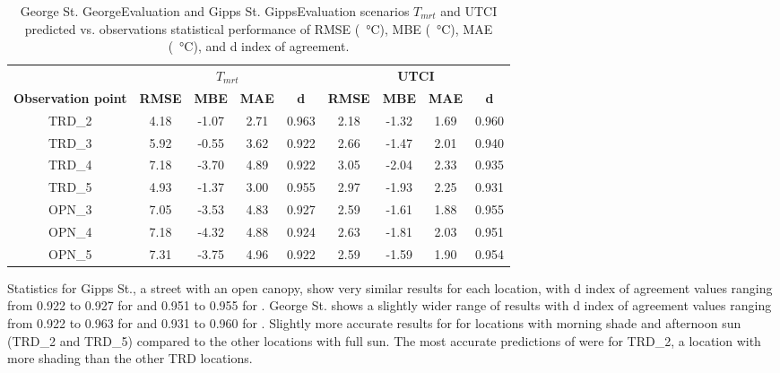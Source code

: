 \documentclass[final,3p,times,authoryear]{elsarticle}
\begin{document}
\begin{center}
\begin{table}
\caption{George St. GeorgeEvaluation and Gipps St. GippsEvaluation scenarios $T_{mrt}$ and UTCI predicted vs. observations statistical performance of RMSE (\SI{}{\degreeCelsius}), MBE (\SI{}{\degreeCelsius}), MAE (\SI{}{\degreeCelsius}), and d index of agreement.\label{tab:georgetmrt}}
  \begin{tabular}{ |c|c | c |c |c  | c | c |  c|c|}   
  \hline    &  \multicolumn{4}{c|}{\textbf{$T_{mrt}$}} & \multicolumn{4}{c|}{\textbf{UTCI}}  \\  
  \textbf{Observation point} 
	& \textbf{RMSE} 
	& \textbf{MBE} 
	& \textbf{MAE} 
	& \textbf{d} 
	& \textbf{RMSE} 
	& \textbf{MBE} 
	& \textbf{MAE}
	& \textbf{d}	
	\\ \hline
TRD\_2 & 4.18 & -1.07 & 2.71 & 0.963 & 2.18 & -1.32 & 1.69 & 0.960  \\ \hline
TRD\_3 & 5.92 & -0.55 & 3.62 & 0.922 & 2.66 & -1.47 & 2.01 & 0.940  \\ \hline
TRD\_4 & 7.18 & -3.70 & 4.89 & 0.922 & 3.05 & -2.04 & 2.33 & 0.935  \\ \hline
TRD\_5 & 4.93 & -1.37 & 3.00 & 0.955 & 2.97 & -1.93 & 2.25 & 0.931  \\ \hline
OPN\_3 & 7.05 & -3.53 & 4.83 & 0.927 & 2.59 & -1.61 & 1.88 & 0.955   \\ \hline
OPN\_4 & 7.18 & -4.32 & 4.88 & 0.924 & 2.63 & -1.81 & 2.03 & 0.951  \\ \hline
OPN\_5 & 7.31 & -3.75 & 4.96 & 0.922 & 2.59 & -1.59 & 1.90 & 0.954  \\ \hline
  \end{tabular} 
\end{table}
\end{center} 

Statistics for Gipps St., a street with an open canopy, show very similar results for each location, with d index of agreement values ranging from 0.922 to 0.927 for  and 0.951 to 0.955 for . George St. shows a slightly wider range of results with d index of agreement values ranging from 0.922 to 0.963 for  and 0.931 to 0.960 for . Slightly more accurate results for  for locations with morning shade and afternoon sun (TRD\_2 and TRD\_5) compared to the other locations with full sun. The most accurate predictions of  were for TRD\_2, a location with more shading than the other TRD locations. 
\end{document}
